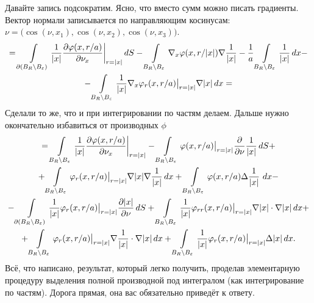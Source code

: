 Давайте запись подсократим. Ясно, что вместо сумм можно писать градиенты. Вектор нормали записывается по направляющим косинусам: $\nu = \big(\cos(\nu,x_1),\cos(\nu,x_2),\cos(\nu,x_3)\big)$.
\begin{multline*}
  =\int\limits_{\partial(B_R\setminus B_\varepsilon)}\frac1{|x|}\frac{\partial \varphi(x,r/a)}{\partial \nu_x}\bigg|_{r=|x|}\,dS - 
  \int\limits_{B_R\setminus B_\varepsilon}\nabla_x\varphi(x,r/|x|)\nabla\frac1{|x|} -
  \frac1a\int\limits_{B_R\setminus B_\varepsilon}\frac1{|x|}\,dx-\\
  -\int\limits_{B_R\setminus B_\varepsilon}\frac1{|x|}\nabla_x\varphi_r(x,r/a)\big|_{r=|x|}\nabla|x|\,dx=
\end{multline*}
Сделали то же, что и при интегрировании по частям делаем. Дальше нужно окончательно избавиться от производных $\phi$
\begin{multline*}
   =\int\limits_{B_R\setminus B_\varepsilon}\frac1{|x|}\frac{\partial \varphi(x,r/a)}{\partial \nu_x}\bigg|_{r=|x|} - 
  \int\limits_{B_R\setminus B_\varepsilon}\varphi(x,r/a)\big|_{r=|x|}\frac{\partial }{\partial \nu}\frac1{|x|}\,dS + \\
  +
  \int\limits_{B_R\setminus B_\varepsilon}\varphi_r(x,r/a)\big|_{r=|x|}\nabla|x|\nabla\frac1{|x|}\,dx + 
  \int\limits_{B_R\setminus B_\varepsilon}\varphi(x,r/a)\Delta\frac1{|x|}\,\,dx - \\
  -
  \int\limits_{\partial(B_R\setminus B_\varepsilon)}\frac1{|x|}\varphi_r(x,r/a)\big|_{r=|x|}\frac{\partial |x|}{\partial \nu}\,dS +
  \int\limits_{B_R\setminus B_\varepsilon}\frac1{|x|}\varphi_{rr}(x,r/a)\big|_{r=|x|}\nabla|x|\cdot \nabla |x|\,dx + \\
  +
  \int\limits_{B_R\setminus B_\varepsilon}\varphi_r(x,r/a)\big|_{r=|x|}\nabla\frac1{|x|}\cdot\nabla|x|\,dx + 
  \int\limits_{B_R\setminus B_\varepsilon}\frac1{|x|}\varphi_r(x,r/a)\big|_{r=|x|}\Delta|x|\,dx.
\end{multline*}
Всё, что написано, результат, который легко получить, проделав элементарную процедуру выделения полной производной под интегралом (как интегрирование по частям). Дорога прямая, она вас обязательно приведёт к ответу.

